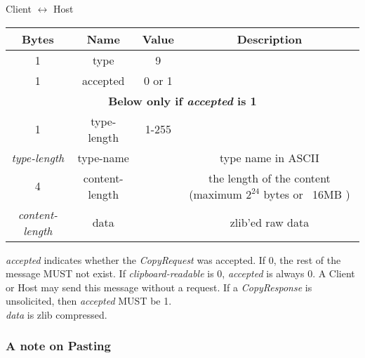\documentclass{article}
\begin{document}
    \begin{center}
        Client $\leftrightarrow$ Host\\
        \begin{tabular}{|c|c|c|c|}
            \hline
            \textbf{Bytes}        & \textbf{Name}  & \textbf{Value} & \textbf{Description}                                         \\
            \hline
            1                     & type           & 9              &                                                              \\
            \hline
            1                     & accepted       & 0 or 1         &                                                              \\
            \hline
            \multicolumn{4}{|c|}{\textbf{Below only if \emph{accepted} is 1} } \\
            \hline
            1                     & type-length    & 1-255          &                                                              \\
            \hline
            \emph{type-length}    & type-name      &                & type name in ASCII                                           \\
            \hline
            4                     & content-length &                & the length of the content (maximum $2^{24}$ bytes or ~16MB ) \\
            \hline
            \emph{content-length} & data           &                & zlib'ed raw data                                             \\
            \hline
        \end{tabular}
    \end{center}



    \emph{accepted} indicates whether the \emph{CopyRequest} was accepted. If 0, the rest of the message MUST not exist.
    If \emph{clipboard-readable} is 0, \emph{accepted} is always 0. A Client or Host may send this message without a request.
    If a \emph{CopyResponse} is unsolicited, then \emph{accepted} MUST be 1.\\

    \emph{data} is zlib compressed.

    \subsubsection{A note on Pasting}
\end{document}
